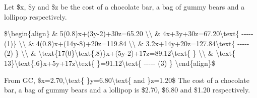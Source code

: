 \item Let \$x, \$y and \$z be the cost of a chocolate bar, a bag of gummy
bears and a lollipop respectively.

\$\textbackslash begin\{align\} \& 5(0.8)x+(3y-2)+30z=65.20 \textbackslash\textbackslash{}
\& 4x+3y+30z=67.20\textbackslash text\{ -{}-{}-{}-{}- (1)\} \textbackslash\textbackslash{}
\& 4(0.8)x+(14y-8)+20z=119.84 \textbackslash\textbackslash{} \&
3.2x+14y+20z=127.84\textbackslash text\{ -{}-{}-{}-{}- (2) \} \textbackslash\textbackslash{}
\& \textbackslash text\{17(0\}\textbackslash text\{.8)\}x+(5y-2)+17z=89.12\textbackslash text\{
\} \textbackslash\textbackslash{} \& \textbackslash text\{ 13\}\textbackslash text\{.6\}x+5y+17z\textbackslash text\{
\}=91.12\textbackslash text\{ -{}-{}-{}-{}- (3) \} \textbackslash end\{align\}\$

From GC, \$x=2.70,\textbackslash text\{ \}y=6.80\textbackslash text\{
and \}z=1.20\$ The cost of a chocolate bar, a bag of gummy bears and
a lollipop is \$2.70, \$6.80 and \$1.20 respectively.